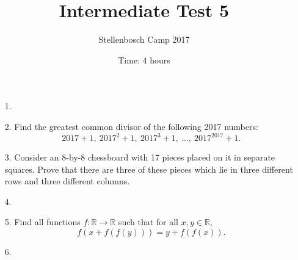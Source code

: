 \documentclass[12pt]{article}
\title{Intermediate Test 5}
\author{Stellenbosch Camp 2017}
\date{Time: 4 hours}
\begin{document}
 \maketitle

\begin{enumerate}

\item[1.] %


\item[2.] %
Find the greatest common divisor of the following 2017 numbers:
  \[ 2017+1,\ 2017^2+1,\ 2017^3+1,\ \dotsc,\ 2017^{2017}+1. \]


\item[3.] %
Consider an 8-by-8 chessboard with 17 pieces placed on it in separate squares. Prove that there are three of these pieces which lie in three different rows and three different columns.


\item[4.] %
 

\item[5.] %
Find all functions $f: \mathbb{R} \to \mathbb{R}$ such that for all $x,y \in \mathbb{R}$,
  \[ f(x+f(f(y))) = y+f(f(x)). \]


\item[6.] %


\end{enumerate}

\vfill

\centering
\begin{BVerbatim}
\end{BVerbatim}
\end{document}
